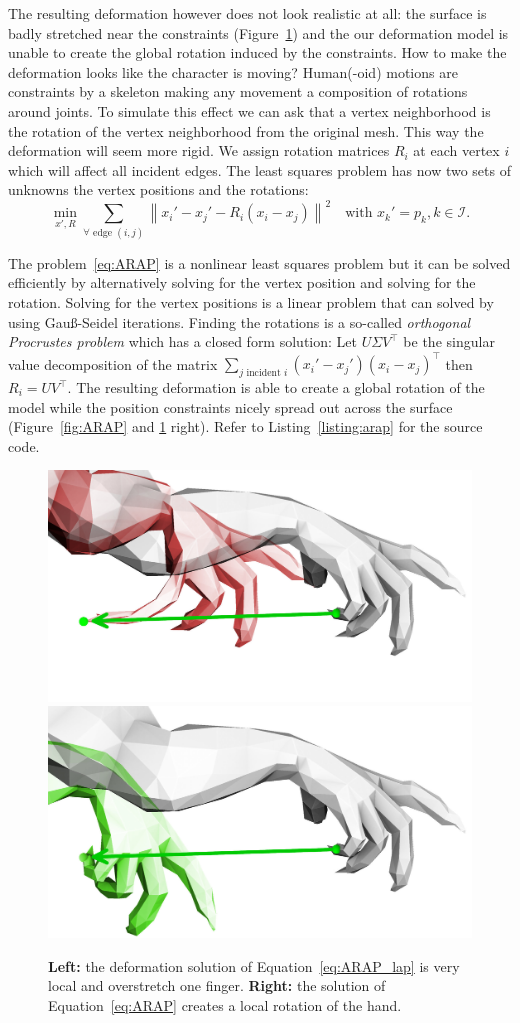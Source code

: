\documentclass[notitlepage,oneside]{book}
\begin{document}
The resulting deformation however does not look realistic at all: the surface is badly stretched near the constraints (Figure~\ref{fig:arap-lap}) and the our deformation model is unable to create the global rotation induced by the constraints. How to make the deformation looks like the character is moving? Human(-oid) motions are constraints by a skeleton making any movement a composition of rotations around joints. To simulate this effect we can ask that a vertex neighborhood is the rotation of the vertex neighborhood from the original mesh. This way the deformation will seem more rigid. We assign rotation matrices $R_i$ at each vertex $i$ which will affect all incident edges. The least squares problem has now two sets of unknowns the vertex positions and the rotations:
\begin{equation}
 \min_{x', R} \sum_{\forall \text{ edge } (i,j)} \left\| x_i' - x_j'- R_i (x_i - x_j) \right\|^2 \quad \text{with } x_k' = p_k , k \in \mathcal{I}.
\label{eq:ARAP}
\end{equation}

The problem~\eqref{eq:ARAP} is a nonlinear least squares problem but it can be solved efficiently by alternatively solving for the vertex position and solving for the rotation.
Solving for the vertex positions is a linear problem that can solved by using Gau\ss-Seidel iterations.
Finding the rotations is a so-called \textit{orthogonal Procrustes problem} which has a closed form solution: Let $U \Sigma V^\top$ be the singular value decomposition of the matrix $\sum_{j\text{ incident }i} (x_i' - x_j')(x_i - x_j)^\top$ then $R_i = U V^\top$. 
The resulting deformation is able to create a global rotation of the model while the position constraints  nicely spread out across the surface (Figure~\ref{fig:ARAP} and \ref{fig:arap-lap} right).
Refer to Listing~\ref{listing:arap} for the source code.

\begin{figure}[h]
 \centering
 \includegraphics[width=0.35\linewidth]{img/arap-lap-a.jpg}
 \includegraphics[width=0.35\linewidth]{img/arap-lap-b.jpg}
 \caption{\textbf{Left:} the deformation solution of Equation~\eqref{eq:ARAP_lap} is very local and overstretch one finger. \textbf{Right:} the solution of Equation~\eqref{eq:ARAP} creates a local rotation of the hand.}
\label{fig:arap-lap}
\end{figure}
\end{document}
